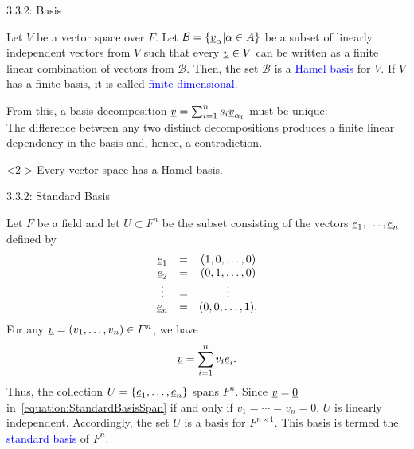 \documentclass[10pt,letterpaper,english]{beamer}
\begin{document}
\begin{frame}{3.3.2: Basis}

\begin{definition}
Let $V$ be a vector space over $F$.
Let $\mathcal{B} = \left\{ \underline{v}_{\alpha} | \alpha \in A \right\}$ be a subset of linearly independent vectors from $V$ such that every $\underline{v} \in V$ can be written as a finite linear combination of vectors from $\mathcal{B}$.
Then, the set $\mathcal{B}$ is a \textcolor{blue}{Hamel basis} for $V$.
If $V$ has a finite basis, it is called \textcolor{blue}{finite-dimensional}.
\end{definition}

\vspace{3mm}

From this, a basis decomposition $\underline{v} = \sum_{i=1}^n s_i \underline{v}_{\alpha_i}$ must be unique: \\[1mm]
\hspace{5mm} The difference between any two distinct decompositions produces a finite linear dependency in the basis and, hence, a contradiction.

\vspace{3mm}

\begin{theorem}<2->
Every vector space has a Hamel basis.
\end{theorem}

\end{frame}

\begin{frame}{3.3.2: Standard Basis}
\begin{example}
Let $F$ be a field and let $U \subset F^n$ be the subset consisting of the vectors $\underline{e}_1, \ldots, \underline{e}_n$ defined by
\begin{equation*}
\begin{array}{ccc}
\underline{e}_1 & = & (1, 0, \ldots, 0) \\
\underline{e}_2 & = & (0, 1, \ldots, 0) \\
\vdots & = & \vdots \\
\underline{e}_n & = & (0, 0, \ldots, 1).
\end{array}
\end{equation*}
For any $\underline{v} = (v_1, \ldots, v_n) \in F^n$, we have
\begin{equation} \label{equation:StandardBasisSpan}
\underline{v} = \sum_{i=1}^n v_i \underline{e}_i.
\end{equation}
Thus, the collection $U = \left\{ \underline{e}_1, \ldots, \underline{e}_n \right\}$ spans $F^n$.
Since $\underline{v} = \underline{0}$ in~\eqref{equation:StandardBasisSpan} if and only if $v_1 = \cdots = v_n = 0$, $U$ is linearly independent.
Accordingly, the set $U$ is a basis for $F^{n \times 1}$.
This basis is termed the \textcolor{blue}{standard basis} of $F^n$.
\end{example}
\end{frame}
\end{document}
